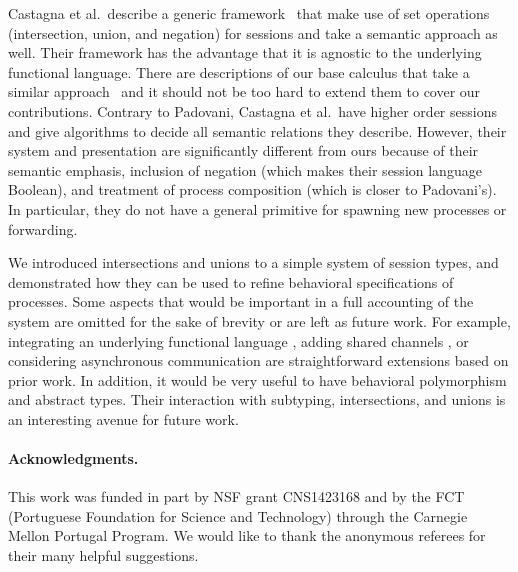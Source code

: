 \documentclass[submission,copyright,creativecommons]{eptcs}
\begin{document}
Castagna et al.\ describe a generic framework~\cite{CastagnaDGP09} that make use of set operations (intersection, union, and negation) for sessions and take a semantic approach as well. Their framework has the advantage that it is agnostic to the underlying functional language. There are descriptions of our base calculus that take a similar approach~\cite{ToninhoCP13} and it should not be too hard to extend them to cover our contributions. Contrary to Padovani, Castagna et al.\ have higher order sessions and give algorithms to decide all semantic relations they describe. However, their system and presentation are significantly different from ours because of their semantic emphasis, inclusion of negation (which makes their session language Boolean), and treatment of process composition (which is closer to Padovani's).  In particular, they do not have a general primitive for spawning new processes or forwarding.

We introduced intersections and unions to a simple system of session types, and demonstrated how they can be used to refine behavioral specifications of processes. Some aspects that would be important in a full accounting of the system are omitted for the sake of brevity or are left as future work. For example, integrating an underlying functional language \cite{ToninhoCP13}, adding shared channels \cite{CairesP10,PfenningG15}, or considering asynchronous communication \cite{DeYoungCPT12,PfenningG15,Griffith16phd} are straightforward extensions based on prior work. In addition, it would be very useful to have behavioral polymorphism \cite{CairesPPT13} and abstract types. Their interaction with subtyping, intersections, and unions is an interesting avenue for future work.

\paragraph{Acknowledgments.}
This work was funded in part by NSF grant CNS1423168 and by the FCT (Portuguese Foundation for Science and Technology) through the Carnegie Mellon Portugal Program.  We would like to thank the anonymous referees for their many helpful suggestions.







\end{document}
